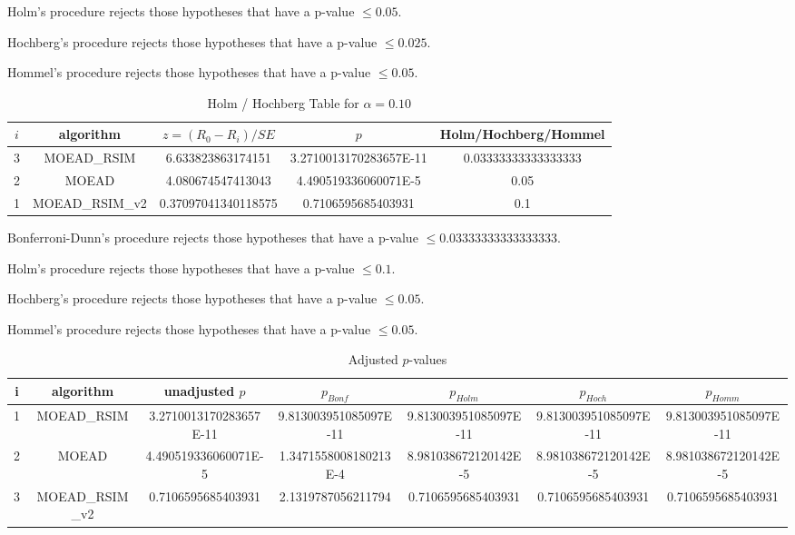 \documentclass[a4paper,10pt]{article}
\begin{document}
\begin{landscape}
Holm's procedure rejects those hypotheses that have a p-value $\le0.05$.


Hochberg's procedure rejects those hypotheses that have a p-value $\le0.025$.


Hommel's procedure rejects those hypotheses that have a p-value $\le0.05$.


\begin{table}[!htp]
\centering\tiny
\caption{Holm / Hochberg Table for $\alpha=0.10$}
\begin{tabular}{ccccc}
$i$&algorithm&$z=(R_0 - R_i)/SE$&$p$&Holm/Hochberg/Hommel\\
\hline
3&MOEAD_RSIM&6.633823863174151&3.2710013170283657E-11&0.03333333333333333\\
2&MOEAD&4.080674547413043&4.490519336060071E-5&0.05\\
1&MOEAD_RSIM_v2&0.37097041340118575&0.7106595685403931&0.1\\
\hline
\end{tabular}
\end{table}
Bonferroni-Dunn's procedure rejects those hypotheses that have a p-value $\le0.03333333333333333$.


Holm's procedure rejects those hypotheses that have a p-value $\le0.1$.


Hochberg's procedure rejects those hypotheses that have a p-value $\le0.05$.


Hommel's procedure rejects those hypotheses that have a p-value $\le0.05$.


\begin{table}[!htp]
\centering\tiny
\caption{Adjusted $p$-values}
\begin{tabular}{ccccccc}
i&algorithm&unadjusted $p$&$p_{Bonf}$&$p_{Holm}$&$p_{Hoch}$&$p_{Homm}$\\
\hline
1&MOEAD_RSIM&3.2710013170283657E-11&9.813003951085097E-11&9.813003951085097E-11&9.813003951085097E-11&9.813003951085097E-11\\
2&MOEAD&4.490519336060071E-5&1.3471558008180213E-4&8.981038672120142E-5&8.981038672120142E-5&8.981038672120142E-5\\
3&MOEAD_RSIM_v2&0.7106595685403931&2.1319787056211794&0.7106595685403931&0.7106595685403931&0.7106595685403931\\
\hline
\end{tabular}
\end{table}


\end{landscape}
\end{document}
